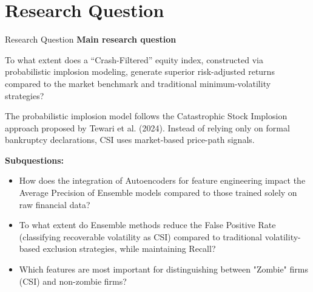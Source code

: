 \documentclass[10pt]{beamer}\usepackage[]{graphicx}\usepackage[table]{xcolor}
\begin{document}

\section{Research Question}
\begin{frame}{Research Question}
\small
\textbf{Main research question}
\begin{alertblock}{}
To what extent does a ``Crash-Filtered'' equity index, constructed via probabilistic implosion modeling, generate superior risk-adjusted returns compared to the market benchmark and traditional minimum-volatility strategies?
\end{alertblock}

The probabilistic implosion model follows the Catastrophic Stock Implosion approach proposed by Tewari et al. (2024). Instead of relying only on formal bankruptcy declarations, CSI uses market-based price-path signals.

\vspace{0.35em}

\textbf{Subquestions:}

  \begin{itemize}
      \setlength\itemsep{0.3em}
    \item How does the integration of Autoencoders for feature engineering impact the Average Precision of Ensemble models compared to those trained solely on raw financial data?
    
    \item To what extent do Ensemble methods reduce the False Positive Rate (classifying recoverable volatility as CSI) compared to traditional volatility-based exclusion strategies, while maintaining Recall?
    
    \item Which features are most important for distinguishing between "Zombie" firms (CSI) and non-zombie firms?
    
  \end{itemize}
  

\end{frame}

\end{document}
